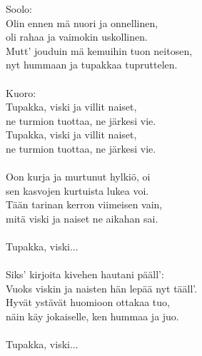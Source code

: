 
        Soolo: \\
        Olin ennen mä nuori ja onnellinen, \\
        oli rahaa ja vaimokin uskollinen. \\
        Mutt' jouduin mä kemuihin tuon neitosen, \\
        nyt hummaan ja tupakkaa tupruttelen. \\
\hspace{10mm} \\
        Kuoro: \\
        Tupakka, viski ja villit naiset, \\
        ne turmion tuottaa, ne järkesi vie. \\
        Tupakka, viski ja villit naiset, \\
        ne turmion tuottaa, ne järkesi vie. \\
\hspace{10mm} \\
        Oon kurja ja murtunut hylkiö, oi \\
        sen kasvojen kurtuista lukea voi. \\
        Tään tarinan kerron viimeisen vain, \\
        mitä viski ja naiset ne aikahan sai. \\
\hspace{10mm} \\
        Tupakka, viski... \\
\hspace{10mm} \\
        Siks' kirjoita kivehen hautani pääll': \\
        Vuoks viskin ja naisten hän lepää nyt tääll'. \\
        Hyvät ystävät huomioon ottakaa tuo, \\
        näin käy jokaiselle, ken hummaa ja juo. \\
\hspace{10mm} \\
        Tupakka, viski... \\
